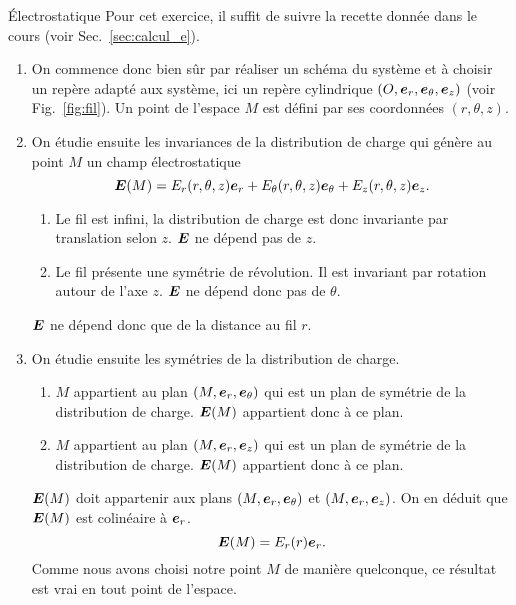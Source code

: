 \begin{corr}{Électrostatique}
	Pour cet exercice, il suffit de suivre la recette donnée dans le cours
	(voir Sec.~\ref{sec:calcul_e}).
	\begin{enumerate}
		\item On commence donc bien sûr par réaliser un schéma du système
		  et à choisir un repère adapté aux système, ici un repère
		  cylindrique $(O, \er, \etheta, \ez)$ (voir Fig.~\ref{fig:fil}).
		  Un point de l'espace $M$ est défini par ses coordonnées 
		  $(r, \theta, z)$.
		\item On étudie ensuite les invariances de la distribution de charge
		  qui génère au point $M$ un champ électrostatique
		  \begin{equation*}
			  \vece(M) = E_r(r, \theta, z)\er + E_\theta(r, \theta, z)\etheta +
			             E_z(r, \theta, z)\ez.
		 \end{equation*}
		 \begin{enumerate}
			 \item Le fil est infini, la distribution de charge est
		           donc invariante par translation selon $z$. $\vece$
			   ne dépend pas de $z$.
			 \item Le fil présente une symétrie de révolution.
		           Il est invariant par rotation autour de l'axe $z$.
			   $\vece$ ne dépend donc pas de $\theta$.
		\end{enumerate}
		$\vece$ ne dépend donc que de la distance au fil $r$.

	\item On étudie ensuite les symétries de la distribution de charge.
	\begin{enumerate}
		\item $M$ appartient au plan $(M, \er, \etheta)$ qui est un plan
			de symétrie de la distribution de charge. $\vece(M)$ appartient
		  donc à ce plan.
		\item $M$ appartient au plan $(M, \er, \ez)$ qui est un plan de
		  symétrie de la distribution de charge. $\vece(M)$ appartient 
		  donc à ce plan.
	\end{enumerate}
	$\vece(M)$ doit appartenir aux plans $(M, \er, \etheta)$ et $(M, \er, \ez)$.
	On en déduit que $\vece(M)$ est colinéaire à $\er$.
	\begin{equation*}
		\vece(M) = E_r(r)\er.
	\end{equation*}
	Comme nous avons choisi
	notre point $M$  de manière quelconque, ce résultat est vrai en tout 
	point de l'espace.


\end{enumerate}
\end{corr}

